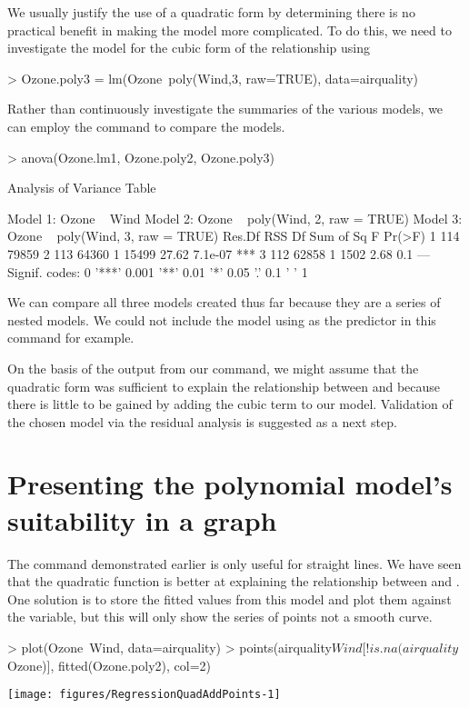 We usually justify the use of a quadratic form by determining there is no practical benefit in making the model more complicated. To do this, we need to investigate the model for the cubic form of the relationship using 
\begin{Schunk}
\begin{Sinput}
> Ozone.poly3 = lm(Ozone~poly(Wind,3, raw=TRUE), data=airquality) 
\end{Sinput}
\end{Schunk}
Rather than continuously investigate the summaries of the various models, we can employ the  command to compare the models.  
\begin{Schunk}
\begin{Sinput}
> anova(Ozone.lm1, Ozone.poly2, Ozone.poly3) 
\end{Sinput}
\begin{Soutput}
Analysis of Variance Table

Model 1: Ozone ~ Wind
Model 2: Ozone ~ poly(Wind, 2, raw = TRUE)
Model 3: Ozone ~ poly(Wind, 3, raw = TRUE)
  Res.Df   RSS Df Sum of Sq     F  Pr(>F)    
1    114 79859                               
2    113 64360  1     15499 27.62 7.1e-07 ***
3    112 62858  1      1502  2.68     0.1    
---
Signif. codes:  
0 '***' 0.001 '**' 0.01 '*' 0.05 '.' 0.1 ' ' 1
\end{Soutput}
\end{Schunk}
We can compare all three models created thus far because they are a series of nested models. We could not include the model using  as the predictor in this command for example. 
 
On the basis of the output from our  command, we might assume that the quadratic form was sufficient to explain the relationship between  and  because there is little to be gained by adding the cubic term to our model. Validation of the chosen model via the residual analysis is suggested as a next step. 
 
\section{Presenting the polynomial model's suitability in a graph} 
 
The  command demonstrated earlier is only useful for straight lines. We have seen that the quadratic function is better at explaining the relationship between  and . One solution is to store the fitted values from this model and plot them against the  variable, but this will only show the series of points not a smooth curve.  
\begin{Schunk}
\begin{Sinput}
> plot(Ozone~Wind, data=airquality) 
> points(airquality$Wind[!is.na(airquality$Ozone)], fitted(Ozone.poly2), col=2) 
\end{Sinput}

\texttt{[image: figures/RegressionQuadAddPoints-1]} \end{Schunk}
 
